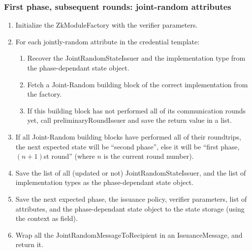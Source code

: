   \subsubsection{First phase, subsequent rounds: joint-random attributes}
  \notimplemented
  \begin{enumerate}
    \item Initialize the ZkModuleFactory with the verifier parameters.
    \item For each jointly-random attribute in the credential template:
      \begin{enumerate}
        \item Recover the JointRandomStateIssuer and the implementation type from the phase-dependant state object.
        \item Fetch a Joint-Random building block of the correct implementation from the factory.
        \item If this building block has not performed all of its communication rounds yet, call preliminaryRoundIssuer and
          save the return value in a list.
      \end{enumerate}
      \item If all Joint-Random building blocks have performed all of their roundtrips, the next expected state will be ``second phase'', else
        it will be ``first phase, $(n+1)$st round'' (where $n$ is the current round number).
      \item Save the list of all (updated or not) JointRandomStateIssuer, and the list of implementation types as the phase-dependant state object.
      \item Save the next expected phase, the issuance policy, verifier parameters, list of attributes,
        and the phase-dependant state object to the state storage (using the context as field).
      \item Wrap all the JointRandomMessageToRecipient in an IssuanceMessage, and return it.
  \end{enumerate}

